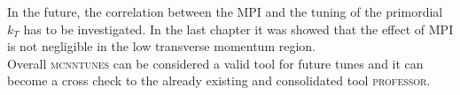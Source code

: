 In the future, the correlation between the MPI and the tuning of the primordial $k_T$ has to be investigated. In the last chapter it was showed that the effect of MPI is not negligible in the low transverse momentum region.
\\
Overall \textsc{mcnntunes} can be considered a valid tool for future tunes and it can become a cross check to the already existing and consolidated tool \textsc{professor}. 
 